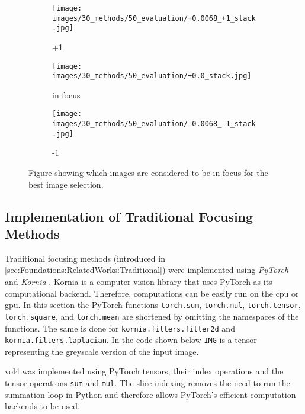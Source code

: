 \begin{figure}[tb]
    \centering
    \begin{subfigure}[t]{0.3\textwidth}
        \centering
        \texttt{[image: images/30\_methods/50\_evaluation/+0.0068\_+1\_stack.jpg]}
        \caption{+1}
    \end{subfigure}
    \begin{subfigure}[t]{0.3\textwidth}
        \centering
        \texttt{[image: images/30\_methods/50\_evaluation/+0.0\_stack.jpg]}
        \caption{in focus}
    \end{subfigure}
    \begin{subfigure}[t]{0.3\textwidth}
        \centering
        \texttt{[image: images/30\_methods/50\_evaluation/-0.0068\_-1\_stack.jpg]}
        \caption{-1}
    \end{subfigure}

    \caption{Figure showing which images are considered to be in focus for the best image selection.}
    \label{fig:Methods:Data:InFocusExampleImages}
\end{figure}


\subsection{Implementation of Traditional Focusing Methods}
\label{sec:Methods:Evaluation:Traditional}

Traditional focusing methods (introduced in \autoref{sec:Foundations:RelatedWorks:Traditional}) were implemented using \emph{PyTorch} \cite{paszke2019pytorch} and \emph{Kornia} \cite{riba2020kornia}. Kornia is a computer vision library that uses PyTorch as its computational backend. Therefore, computations can be easily run on the \ac{cpu} or \ac{gpu}. In this section the PyTorch functions \texttt{torch.sum}, \texttt{torch.mul}, \texttt{torch.tensor}, \texttt{torch.square}, and \texttt{torch.mean} are shortened by omitting the namespaces of the functions. The same is done for \texttt{kornia.filters.filter2d} and \texttt{kornia.filters.laplacian}. In the code shown below \texttt{IMG} is a tensor representing the greyscale version of the input image.

\Ac{vol4} was implemented using PyTorch tensors, their index operations and the tensor operations \texttt{sum} and \texttt{mul}. The slice indexing removes the need to run the summation loop in Python and therefore allows PyTorch's efficient computation backends to be used.

